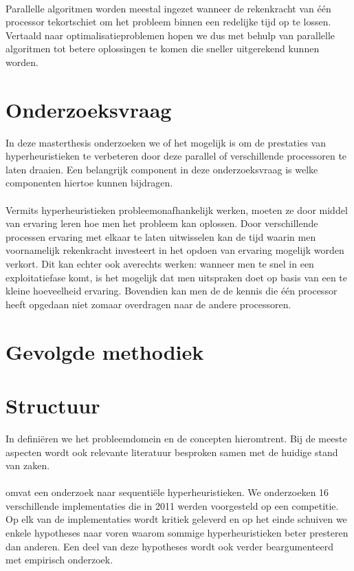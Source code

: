 \paragraph{}
Parallelle algoritmen worden meestal ingezet wanneer de rekenkracht van \'e\'en processor tekortschiet om het probleem binnen een redelijke tijd op te lossen. Vertaald naar optimalisatieproblemen hopen we dus met behulp van parallelle algoritmen tot betere oplossingen te komen die sneller uitgerekend kunnen worden.

\section{Onderzoeksvraag}

In deze masterthesis onderzoeken we of het mogelijk is om de prestaties van hyperheuristieken te verbeteren door deze parallel of verschillende processoren te laten draaien. Een belangrijk component in deze onderzoeksvraag is welke componenten hiertoe kunnen bijdragen.

\paragraph{}
Vermits hyperheuristieken probleemonafhankelijk werken, moeten ze door middel van ervaring leren hoe men het probleem kan oplossen. Door verschillende processen ervaring met elkaar te laten uitwisselen kan de tijd waarin men voornamelijk rekenkracht investeert in het opdoen van ervaring mogelijk worden verkort. Dit kan echter ook averechts werken: wanneer men te snel in een exploitatiefase komt, is het mogelijk dat men uitspraken doet op basis van een te kleine hoeveelheid ervaring. Bovendien kan men de de kennis die \'e\'en processor heeft opgedaan niet zomaar overdragen naar de andere processoren.

\section{Gevolgde methodiek}


\section{Structuur}
In  defini\"eren we het probleemdomein en de concepten hieromtrent. Bij de meeste aspecten wordt ook relevante literatuur besproken samen met de huidige stand van zaken.

\paragraph{}
 omvat een onderzoek naar sequenti\"ele hyperheuristieken. We onderzoeken 16 verschillende implementaties die in 2011 werden voorgesteld op een competitie. Op elk van de implementaties wordt kritiek geleverd en op het einde schuiven we enkele hypotheses naar voren waarom sommige hyperheuristieken beter presteren dan anderen. Een deel van deze hypotheses wordt ook verder beargumenteerd met empirisch onderzoek.

